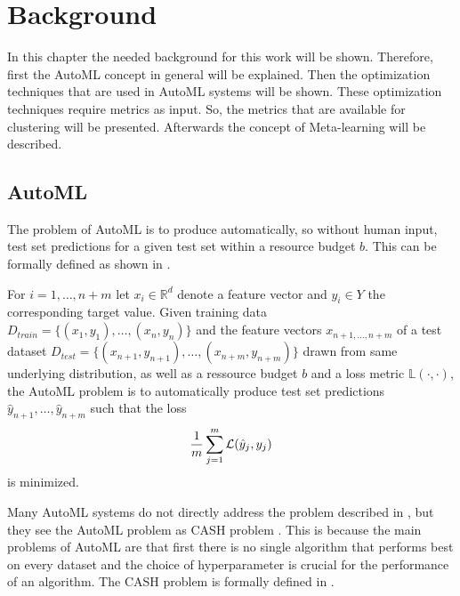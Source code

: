 \chapter{Background}
\label{chap:background}

In this chapter the needed background for this work will be shown.
Therefore, first the AutoML concept in general will be explained.
Then the optimization techniques that are used in AutoML systems will be shown.
These optimization techniques require metrics as input.
So, the metrics that are available for clustering will be presented.
Afterwards the concept of Meta-learning will be described.

\section{AutoML}
The problem of \gls{AutoML} is to produce automatically, so without human input, test set predictions for a given test set within a resource budget $b$.
This can be formally defined as shown in .

\begin{definition}
\label{def:automl}
For $i = 1, \dots, n+m$ let $x_i \in \mathbb{R}^d$ denote a feature vector and $y_i \in Y $ the corresponding target value.
Given training data $D_{train} = \lbrace (x_1, y_1), \dots, (x_n, y_n) \rbrace $ and the feature vectors $x_{n+1, \dots, n+m}$ of a test dataset $D_{test} = \lbrace (x_{n+1}, y_{n+1}), \dots, (x_{n+m}, y_{n+m})  \rbrace$ drawn from same underlying distribution, as well as a ressource budget $b$ and a loss metric $\mathbb{L}(\cdot, \cdot)$, the \gls{AutoML} problem is to automatically produce test set predictions $\hat{y}_{n+1}, \dots, \hat{y}_{n+m}$ such that the loss 
\begin{equation*}
    \frac{1}{m} \sum_{j=1}^m \mathcal{L}(\hat{y}_j, y_j)
\end{equation*}
is minimized.
\end{definition}


Many \gls{AutoML} systems do not directly address the problem described in , but they see the \gls{AutoML} problem as \gls{CASH} problem \cite{Feurer2015EfficientLearning,  Kotthoff2017Auto-WEKAWEKA}. 
This is because the main problems of \gls{AutoML} are that first there is no single algorithm that performs best on every dataset and the choice of hyperparameter is crucial for the performance of an algorithm.
The \gls{CASH} problem is formally defined in .

